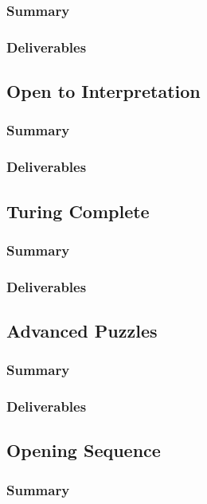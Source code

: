 \subsubsection{Summary}
\subsubsection{Deliverables}

\subsection{Open to Interpretation}
\subsubsection{Summary}
\subsubsection{Deliverables}

\subsection{Turing Complete}
\subsubsection{Summary}
\subsubsection{Deliverables}

\subsection{Advanced Puzzles}
\subsubsection{Summary}
\subsubsection{Deliverables}

\subsection{Opening Sequence}
\subsubsection{Summary}
